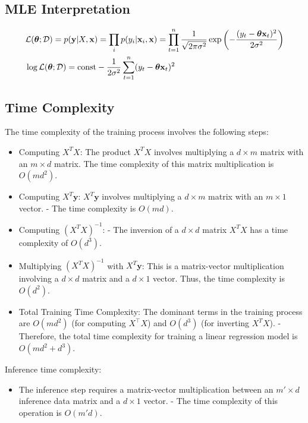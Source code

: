 \subsection{MLE Interpretation}
\begin{align*}
	&\mathcal{L}(\boldsymbol{\theta}; \mathcal{D}) = p({\mathbf{y}} | X, {\mathbf{x}} ) = \prod_i p(y_i | {\mathbf{x}}_i, {\mathbf{x}} ) = \prod_{t=1}^n \frac{1}{\sqrt{2\pi \sigma^2}} \exp \left(-\frac{(y_t-\boldsymbol{\theta}{\mathbf{x}}_t)^2}{2\sigma^2}\right)\\
	&\log \mathcal{L}(\boldsymbol{\theta}; \mathcal{D}) = \text{const} - \frac{1}{2\sigma^2}\sum_{t=1}^n(y_t-\boldsymbol{\theta}{\mathbf{x}}_t)^2
\end{align*}

\subsection{Time Complexity}
The time complexity of the training process involves the following steps:
\begin{itemize}
	\item Computing \( X^T X \): The product \( X^T X \) involves multiplying a \( d \times m \) matrix with an \( m \times d \) matrix. The time complexity of this matrix multiplication is \( O(md^2) \).
	\item Computing \( X^T \mathbf{y} \): \( X^T \mathbf{y} \) involves multiplying a \( d \times m \) matrix with an \( m \times 1 \) vector.
	 - The time complexity is \( O(md) \).
	\item Computing \( \left( X^T X \right)^{-1} \):
 - The inversion of a \( d \times d \) matrix \( X^T X \) has a time complexity of \( O(d^3) \).
	\item Multiplying \( \left( X^T X \right)^{-1} \) with \( X^T \mathbf{y} \): This is a matrix-vector multiplication involving a \( d \times d \) matrix and a \( d \times 1 \) vector. Thus, the time complexity is \( O(d^2) \).
	\item Total Training Time Complexity: The dominant terms in the training process are \( O(md^2) \) (for computing \( X^\top X \)) and \( O(d^3) \) (for inverting \( X^T X \)).
- Therefore, the total time complexity for training a linear regression model is \( O(md^2 + d^3) \).
\end{itemize}

Inference time complexity:
\begin{itemize}
	\item The inference step requires a matrix-vector multiplication between an \( m' \times d \) inference data matrix and a \( d \times 1 \) vector.
- The time complexity of this operation is \( O(m'd) \).
\end{itemize}

